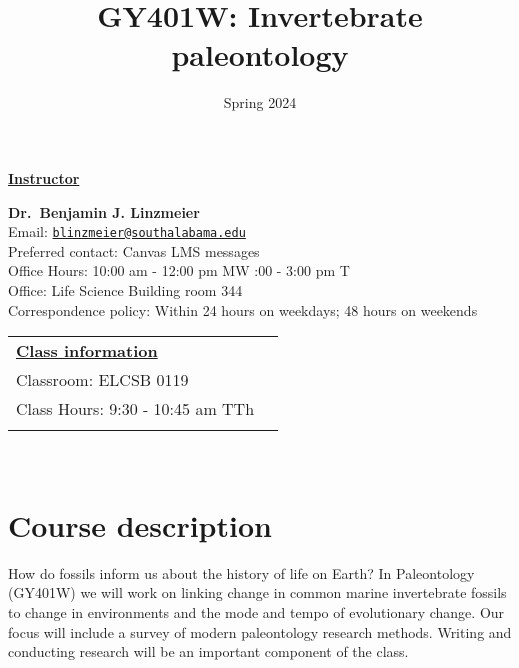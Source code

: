 \documentclass[11pt,]{article}
\title{GY401W: Invertebrate paleontology}
\date{Spring 2024}
\begin{document}
  

		\maketitle
		
	
		\thispagestyle{firststyle}

\textbf{\underline{Instructor}}
\begin{multicols}{2}

  \textbf{Dr.~Benjamin J. Linzmeier}\\
  Email: \href{mailto:blinzmeier@southalabama.edu}{\nolinkurl{blinzmeier@southalabama.edu}}\\
  Preferred contact: Canvas LMS messages\\
  Office Hours: 10:00 am - 12:00 pm MW :00 - 3:00 pm T\\
  Office: Life Science Building room 344\\
  Correspondence policy: Within 24 hours on weekdays; 48 hours on
weekends\\
    \columnbreak
    
  \end{multicols}
	
\noindent \begin{tabular*}{\textwidth}{ @{\extracolsep{\fill}} lr @{\extracolsep{\fill}}}
\textbf{\underline{Class information}}\\
  Classroom: ELCSB 0119\\
  Class Hours: 9:30 - 10:45 am TTh\\
    \\
	\end{tabular*}\\


\vspace{2mm}


\hypertarget{course-description}{%
\section{Course description}\label{course-description}}

How do fossils inform us about the history of life on Earth? In
Paleontology (GY401W) we will work on linking change in common marine
invertebrate fossils to change in environments and the mode and tempo of
evolutionary change. Our focus will include a survey of modern
paleontology research methods. Writing and conducting research will be
an important component of the class.
\end{document}
